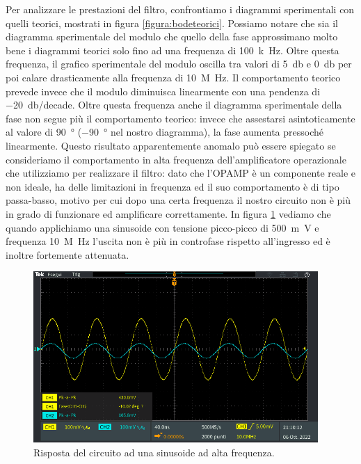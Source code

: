 \documentclass{report}
\begin{document}
Per analizzare le prestazioni del filtro, confrontiamo i diagrammi sperimentali con quelli teorici, mostrati in figura \ref{figura:bodeteorici}. Possiamo notare che sia il diagramma sperimentale del modulo che quello della fase approssimano molto bene i diagrammi teorici solo fino ad una frequenza di \SI{100}{k\hertz}. Oltre questa frequenza, il grafico sperimentale del modulo oscilla tra valori di \SI{5}{\decibel} e \SI{0}{\decibel} per poi calare drasticamente alla frequenza di \SI {10}{M\hertz}. Il comportamento teorico prevede invece che il modulo diminuisca linearmente con una pendenza di \SI{-20}{\decibel}/decade. Oltre questa frequenza anche il diagramma sperimentale della fase non segue più il comportamento teorico: invece che assestarsi asintoticamente al valore di \SI{90}{\degree} (\SI{-90}{\degree} nel nostro diagramma), la fase aumenta pressoché linearmente. Questo risultato apparentemente anomalo può essere spiegato se consideriamo il comportamento in alta frequenza dell'amplificatore operazionale che utilizziamo per realizzare il filtro: dato che l'OPAMP è un componente reale e non ideale, ha delle limitazioni in frequenza ed il suo comportamento è di tipo passa-basso, motivo per cui dopo una certa frequenza il nostro circuito non è più in grado di funzionare ed amplificare correttamente. In figura \ref{figura:TEK13} vediamo che quando applichiamo una sinusoide con tensione picco-picco di \SI{500}{m\volt} e frequenza \SI{10}{M\hertz} l'uscita non è più in controfase rispetto all'ingresso ed è inoltre fortemente attenuata.
\begin{figure}[h!]
	\centering
	\includegraphics[height=6.5cm]{immagini/TEK00013}
	\caption{Risposta del circuito ad una sinusoide ad alta frequenza.}
	\label{figura:TEK13}
\end{figure}
\end{document}
